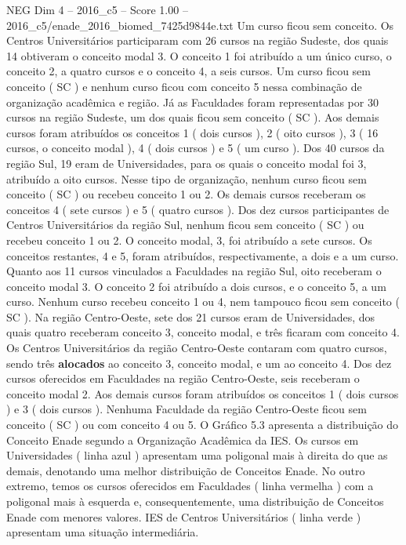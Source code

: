 \begin{textsample}{NEG Dim 4 – 2016\_c5 – Score 1.00 – 2016\_c5/enade\_2016\_biomed\_7425d9844e.txt}
Um curso ficou sem conceito.
Os Centros Universitários participaram com 26 cursos na região Sudeste, dos quais 14 obtiveram o conceito modal 3.
O conceito 1 foi atribuído a um único curso, o conceito 2, a quatro cursos e o conceito 4, a seis cursos.
Um curso ficou sem conceito ( SC ) e nenhum curso ficou com conceito 5 nessa combinação de organização acadêmica e região.
Já as Faculdades foram representadas por 30 cursos na região Sudeste, um dos quais ficou sem conceito ( SC ).
Aos demais cursos foram atribuídos os conceitos 1 ( dois cursos ), 2 ( oito cursos ), 3 ( 16 cursos, o conceito modal ), 4 ( dois cursos ) e 5 ( um curso ).
Dos 40 cursos da região Sul, 19 eram de Universidades, para os quais o conceito modal foi 3, atribuído a oito cursos.
Nesse tipo de organização, nenhum curso ficou sem conceito ( SC ) ou recebeu conceito 1 ou 2.
Os demais cursos receberam os conceitos 4 ( sete cursos ) e 5 ( quatro cursos ).
Dos dez cursos participantes de Centros Universitários da região Sul, nenhum ficou sem conceito ( SC ) ou recebeu conceito 1 ou 2.
O conceito modal, 3, foi atribuído a sete cursos.
Os conceitos restantes, 4 e 5, foram atribuídos, respectivamente, a dois e a um curso.
Quanto aos 11 cursos vinculados a Faculdades na região Sul, oito receberam o conceito modal 3.
O conceito 2 foi atribuído a dois cursos, e o conceito 5, a um curso.
Nenhum curso recebeu conceito 1 ou 4, nem tampouco ficou sem conceito ( SC ).
Na região Centro-Oeste, sete dos 21 cursos eram de Universidades, dos quais quatro receberam conceito 3, conceito modal, e três ficaram com conceito 4.
Os Centros Universitários da região Centro-Oeste contaram com quatro cursos, sendo três \textbf{alocados} ao conceito 3, conceito modal, e um ao conceito 4.
Dos dez cursos oferecidos em Faculdades na região Centro-Oeste, seis receberam o conceito modal 2.
Aos demais cursos foram atribuídos os conceitos 1 ( dois cursos ) e 3 ( dois cursos ).
Nenhuma Faculdade da região Centro-Oeste ficou sem conceito ( SC ) ou com conceito 4 ou 5.
O Gráfico 5.3 apresenta a distribuição do Conceito Enade segundo a Organização Acadêmica da IES.
Os cursos em Universidades ( linha azul ) apresentam uma poligonal mais à direita do que as demais, denotando uma melhor distribuição de Conceitos Enade.
No outro extremo, temos os cursos oferecidos em Faculdades ( linha vermelha ) com a poligonal mais à esquerda e, consequentemente, uma distribuição de Conceitos Enade com menores valores.
IES de Centros Universitários ( linha verde ) apresentam uma situação intermediária.

\end{textsample}
